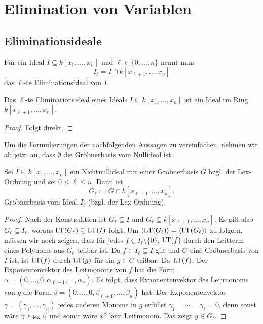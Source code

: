 \documentclass[11pt]{article}
\numberwithin{equation}{section}
\begin{document}
\section{Elimination von Variablen}

\subsection{Eliminationsideale} 

\begin{definition}
	Für ein Ideal $I \subseteq k[x_1,\ldots,x_n]$ und $\ell \in \{0,\ldots,n\}$ nennt man 
	\[
		 I_\ell = I \cap k[x_{\ell+1},\ldots,x_n]
	\]
	das $\ell$-te Eliminationsideal von $I$. 
\end{definition}  

\begin{proposition} 
	Das $\ell$-te Eliminationsideal eines Ideals $I \subseteq k[x_1,\ldots,x_n]$ ist ein Ideal im Ring $k[x_{\ell+1},\ldots,x_n]$. 
\end{proposition} 
\begin{proof} 
	Folgt direkt.  
\end{proof} 

\begin{remark}
	Um die Formulierungen der nachfolgenden Aussagen zu vereinfachen, nehmen wir ab jetzt an, dass $\emptyset$ die Gröbnerbasis vom Nullideal ist. 
\end{remark} 

\begin{theorem} \label{elim:thm} Sei $I \subseteq k[x_1,\ldots,x_n]$ ein Nichtnullideal mit einer Gröbnerbasis $G$ bzgl. der Lex-Ordnung und sei $0 \le \ell \le n$. Dann ist 
	\[
		G_\ell := G \cap k[x_{\ell+1},\ldots,x_n].
	\]
	Gröbnerbasis vom Ideal $I_\ell$ (bzgl. der Lex-Ordnung). 
\end{theorem} 
\begin{proof} 
	Nach der Konstruktion ist $G_\ell \subseteq I$ und $G_\ell \subseteq k[x_{\ell+1},\ldots,x_n]$. Es gilt also $G_\ell \subseteq I_\ell$, woraus $\operatorname{LT}(G_\ell) \subseteq \operatorname{LT}(I)$ folgt. Um $\left< \operatorname{LT}(G_\ell) \right> = \left< \operatorname{LT}(G_\ell) \right>$ zu folgern, müssen wir noch zeigen, dass für jedes $f \in I_\ell \setminus \{0\}$, $\operatorname{LT}(f)$ durch den Leitterm eines Polynoms aus $G_\ell$ teilbar ist. Da $f \in I_\ell \subseteq I$ gilt und $G$ eine Gröbnerbasis von $I$ ist, ist $\operatorname{LT}(f)$ durch $\operatorname{LT}(g)$ für ein $g \in G$ teilbar.  Da $\operatorname{LT}(f)$. Der Exponentenvektor des Leitmonoms von $f$ hat die Form $\alpha = (0,\ldots, 0,\alpha_{\ell+1},\ldots, \alpha_n)$. Es folgt, dass Exponentenvektor des Leitmonoms von $g$ die Form $\beta = (0,\ldots, 0,\beta_{\ell+1},\ldots, \beta_n)$ hat. Der Exponentenvektor $\gamma = (\gamma_1,\ldots, \gamma_n)$  jedes anderen Monoms in $g$ erfüllst $\gamma_1= \cdots = \gamma_\ell =0$, denn sonst wäre $\gamma \succ_{\operatorname{lex}} \beta$ und somit wäre $x^\beta$ kein Leitmonom. Das zeigt $g \in G_\ell$.  
\end{proof} 
\end{document}
